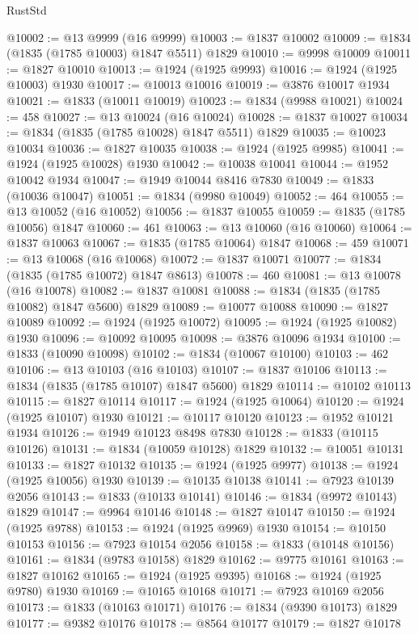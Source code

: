 \begin{lexlean}{RustStd}
\begin{coremodule}
{\begin{coremodule}
{{{{{@10002 := @13 @9999 (@16 @9999)
@10003 := @1837 @10002
@10009 := @1834 (@1835 (@1785 @10003) @1847 @5511) @1829
@10010 := @9998 @10009
@10011 := @1827 @10010
@10013 := @1924 (@1925 @9993)
@10016 := @1924 (@1925 @10003) @1930
@10017 := @10013 @10016
@10019 := @3876 @10017 @1934
@10021 := @1833 (@10011 @10019)
@10023 := @1834 (@9988 @10021)
@10024 := 458
@10027 := @13 @10024 (@16 @10024)
@10028 := @1837 @10027
@10034 := @1834 (@1835 (@1785 @10028) @1847 @5511) @1829
@10035 := @10023 @10034
@10036 := @1827 @10035
@10038 := @1924 (@1925 @9985)
@10041 := @1924 (@1925 @10028) @1930
@10042 := @10038 @10041
@10044 := @1952 @10042 @1934
@10047 := @1949 @10044 @8416 @7830
@10049 := @1833 (@10036 @10047)
@10051 := @1834 (@9980 @10049)
@10052 := 464
@10055 := @13 @10052 (@16 @10052)
@10056 := @1837 @10055
@10059 := @1835 (@1785 @10056) @1847
@10060 := 461
@10063 := @13 @10060 (@16 @10060)
@10064 := @1837 @10063
@10067 := @1835 (@1785 @10064) @1847
@10068 := 459
@10071 := @13 @10068 (@16 @10068)
@10072 := @1837 @10071
@10077 := @1834 (@1835 (@1785 @10072) @1847 @8613)
@10078 := 460
@10081 := @13 @10078 (@16 @10078)
@10082 := @1837 @10081
@10088 := @1834 (@1835 (@1785 @10082) @1847 @5600) @1829
@10089 := @10077 @10088
@10090 := @1827 @10089
@10092 := @1924 (@1925 @10072)
@10095 := @1924 (@1925 @10082) @1930
@10096 := @10092 @10095
@10098 := @3876 @10096 @1934
@10100 := @1833 (@10090 @10098)
@10102 := @1834 (@10067 @10100)
@10103 := 462
@10106 := @13 @10103 (@16 @10103)
@10107 := @1837 @10106
@10113 := @1834 (@1835 (@1785 @10107) @1847 @5600) @1829
@10114 := @10102 @10113
@10115 := @1827 @10114
@10117 := @1924 (@1925 @10064)
@10120 := @1924 (@1925 @10107) @1930
@10121 := @10117 @10120
@10123 := @1952 @10121 @1934
@10126 := @1949 @10123 @8498 @7830
@10128 := @1833 (@10115 @10126)
@10131 := @1834 (@10059 @10128) @1829
@10132 := @10051 @10131
@10133 := @1827 @10132
@10135 := @1924 (@1925 @9977)
@10138 := @1924 (@1925 @10056) @1930
@10139 := @10135 @10138
@10141 := @7923 @10139 @2056
@10143 := @1833 (@10133 @10141)
@10146 := @1834 (@9972 @10143) @1829
@10147 := @9964 @10146
@10148 := @1827 @10147
@10150 := @1924 (@1925 @9788)
@10153 := @1924 (@1925 @9969) @1930
@10154 := @10150 @10153
@10156 := @7923 @10154 @2056
@10158 := @1833 (@10148 @10156)
@10161 := @1834 (@9783 @10158) @1829
@10162 := @9775 @10161
@10163 := @1827 @10162
@10165 := @1924 (@1925 @9395)
@10168 := @1924 (@1925 @9780) @1930
@10169 := @10165 @10168
@10171 := @7923 @10169 @2056
@10173 := @1833 (@10163 @10171)
@10176 := @1834 (@9390 @10173) @1829
@10177 := @9382 @10176
@10178 := @8564 @10177
@10179 := @1827 @10178
}}}}}
\end{coremodule}}
\end{coremodule}
\end{lexlean}
